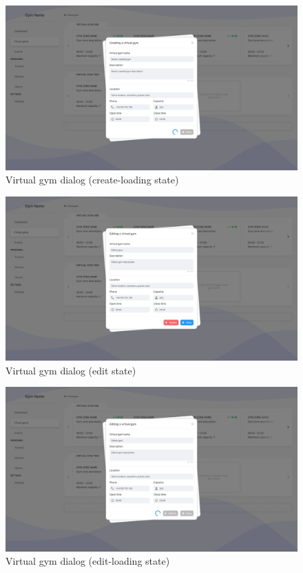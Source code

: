 \documentclass[a4paper, 12pt, oneside]{book}
\begin{document}
\begin{figure}[h!]
	\centering
	\includegraphics[width=\textwidth]{assets/ui/CreateLoadingVirtualGym.png}
	\caption{Virtual gym dialog (create-loading state)}
\end{figure}
\begin{figure}[h!]
	\centering
	\includegraphics[width=\textwidth]{assets/ui/EditVirtualGym.png}
	\caption{Virtual gym dialog (edit state)}
\end{figure}
\begin{figure}[h!]
	\centering
	\includegraphics[width=\textwidth]{assets/ui/EditLoadingVirtualGym.png}
	\caption{Virtual gym dialog (edit-loading state)}
\end{figure}
\end{document}
